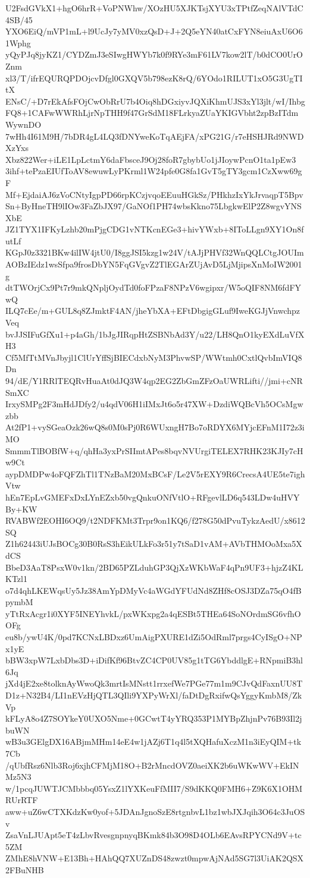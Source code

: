 U2FsdGVkX1+hgO6hrR+VoPNWhw/XOzHU5XJKTsjXYU3xTPtfZeqNAlVTdC4SB/45
YXO6EiQ/mVP1mL+l9UcJy7yMV0xzQsD+J+2Q5eYN40atCxFYN8eiuAxU6O61Wphg
yQyPJq8jyKZ1/CYDZmJ3eSIwgHWYb7k0f9RYe3mF61LV7kow2lT/b0dCO0UrOZnm
xl3/T/ifrEQURQPDOjcvDfgl0GXQV5b798ezK8rQ/6YOdo1RILUT1xO5G3UgTItX
ENsC/+D7rEkAfsFOjCwObRrU7b4Oiq8hDGxiyvJQXiKhmUJS3xYl3jlt/wI/Ihbg
FQ8+1CAFwWWRhLjrNpTHH9f47GrSdM18FLrkyaZUaYKIGVbht2zpBzITdmWywnDO
7wHh4I61M9H/7bDR4gL4LQ3fDNYweKoTqAEjFA/xPG21G/r7eHSHJRd9NWDXzYxs
Xbz822Wer+iLE1LpLctmY6daFbsceJ9Oj28foR7gbybUo1jJIoywPcnO1ta1pEw3
3ihf+tePzaEIUfToAV8ewuwLyPKrml1W24pfe0G8fa1GvT5gTY3gcm1CzXww69gF
Mf+EjdaiAJ6zVoCNtyIgpPD66rpKCzjvqoEEuuHGkSz/PHkhzIxYkJrvaqpT5Bpv
Sn+ByHneTH9lIOw3FaZbJX97/GaNOf1PH74wbsKkno75LbgkwElP2Z8wgvYNSXbE
JZ1TYX1IFKyLzhb20mPjgCDG1vNTKcnEGe3+hivYWxb+8IToLLgn9XY1On8futLf
KGpJ0z3321BKw4ilIW4jtU0/I8ggJSI5kzg1w24V/tAJjPHVf32WnQQLCtgJOUIm
AOBzIEdz1wsSfpa9frosDbYN5FqGVgvZ2TlEGArZUjAvD5LjMjipsXnMoIW2001g
dtTWOrjCx9Pt7r9mkQNpljOydTd0foFPzaF8NPzV6wgipxr/W5oQIF8NM6fdFYwQ
ILQ7cEe/m+GUL8q8ZJmktF4AN/jheYbXA+EFtDbgigGLuf9IweKGJjVnwchpzVeq
bvJJSIFuGfXu1+p4aGh/1bJgJIRqpHtZSBNbAd3Y/u22/LH8QnO1kyEXdLuVfXH3
Cf5MfTtMVnJbyjl1ClUrYffSjBIECdxbNyM3PhvwSP/WWtmh0CxtlQvbImVIQ8Dn
94/dE/Y1RRlTEQRvHuaAt0dJQ3W4qp2EG2ZbGmZFzOaUWRLifti//jmi+cNRSmXC
IrxySMPg2F3mHdJDfy2/u4qdV06H1iIMxJt6o5r47XW+DzdiWQBcVh5OCsMgwzbb
At2fP1+vySGeaOzk26wQ8s0M0sPj0R6WUxngH7Bo7oRDYX6MYjcEFnM1I72z3iMO
SmmmTlBOBfW+q/qhHa3yxPrSIImtAPes8bqvNVUrgiTELEX7RHK23KJIy7cHw9Ct
aypDMDPw4oFQFZhTl1TNzBaM20MxBCsF/Le2V5rEXY9R6CrecsA4UE5te7ighVtw
hEn7EpLvGMEFxDxLYnEZxb50vgQnkuONfVtlO+RFgevlLD6q543LDw4uHVYBy+KW
RVABWf2EOHI6OQ9/t2NDFKMt3Trpr9on1KQ6/f278G50dPvuTykzAedU/x8612SQ
Z1h62443iUJsBOCg30B0RsS3hEikULkFo3r51y7tSaD1vAM+AVbTHMOoMxa5XdCS
BbeD3AaT8PsxW0v1kn/2BD65PZLduhGP3QjXzWKbWaF4qPn9UF3+hjzZ4KLKTzl1
o7d4qhLKEWqsUy5Jz38AmYpDMyVc4aWGdYFUdNd8ZHf8cOSJ3DZa75qO4fBpymbM
yTtRxAcgr1i0XYF5INEYhvkL/pxWKxpg2a4qESBt5THEa64SoNOrdmSG6vfhOOFg
eu8b/ywU4K/0pd7KCNxLBDxz6UmAigPXURE1dZi5OdRml7prgs4CyISgO+NPx1yE
bBW3xpW7LxbDbs3D+iDifKf96BtvZC4CP0UV85g1tTG6YbddlgE+RNpmiB3hl6Jq
jXd4jE2xe8tolknAyWwoQk3mrtIsMNstt1rrxefWe7PGe77m1m9CJvQdFaxnUU8T
D1z+N32B4/LI1nEVzHjQTL3QIli9YXPyWrXl/faDtDgRxifwQsYggyKmbM8/ZkVp
kFLyA8o4Z7SOYkeY0UXO5Nme+0GCwtT4yYRQ353P1MYBpZhjnPv76B93Il2jbuWN
wB3u3GElgDX16ABjmMHm14eE4w1jAZj6T1q4l5tXQHafuXczM1n3iEyQIM+tk7Cb
/qUbfRsz6Nlb3Roj6xjhCFMjM18O+B2rMncdOVZ0aeiXK2b6uWKwWV+EkINMz5N3
w/1pcqJUWTJCMbbbq05YsxZ1lYXKeuFfMII7/S9dKKQ0FMH6+Z9K6X1OHMRUrRTF
aww+uZ6wCTXKdzKw0yof+5JDAnJgnoSzE8rtgnbvL1bz1wbJXJqih3O64c3JuOSv
ZsaVnLJUApt5eT4zLbvRvesgnpnyqBKmk84b3O98D4OLb6EAvsRPYCNd9V+tc5ZM
ZMhE8hVNW+E13Bh+HAhQQ7XUZnDS48zwzt0mpwAjNAd5SG7l3UiAK2QSX2FBuNHB
